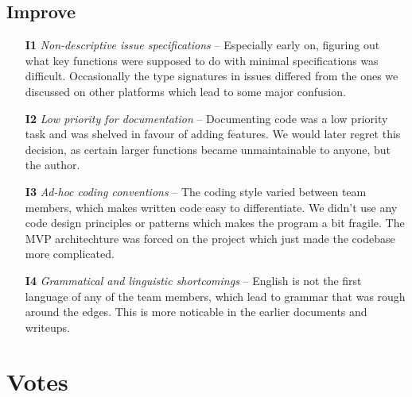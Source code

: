 \documentclass{article}
\begin{document}
\subsection*{Improve}
\begin{itemize}
  \item[\textbf{I1}] \textit{Non-descriptive issue specifications} -- Especially early on, figuring out what key functions were supposed to do with minimal specifications was difficult. Occasionally the type signatures in issues differed from the ones we discussed on other platforms which lead to some major confusion.
  \item[\textbf{I2}] \textit{Low priority for documentation} -- Documenting code was a low priority task and was shelved in favour of adding features. We would later regret this decision, as certain larger functions became unmaintainable to anyone, but the author.
  \item[\textbf{I3}] \textit{Ad-hoc coding conventions} -- The coding style varied between team members, which makes written code easy to differentiate. We didn't use any code design principles or patterns which makes the program a bit fragile. The MVP architechture was forced on the project which just made the codebase more complicated.
  \item[\textbf{I4}] \textit{Grammatical and linguistic shortcomings} -- English is not the first language of any of the team members, which lead to grammar that was rough around the edges. This is more noticable in the earlier documents and writeups.
\end{itemize}

\newpage
\section*{Votes}
\end{document}
